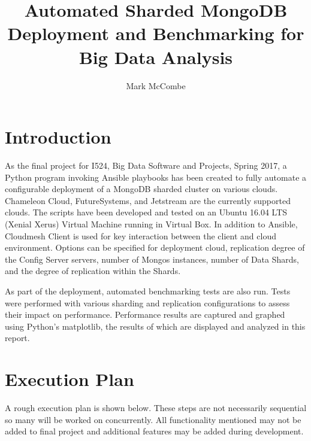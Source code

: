 \documentclass[9pt,twocolumn,twoside]{../../styles/osajnl}
\title{Automated Sharded MongoDB Deployment and Benchmarking for Big Data Analysis}
\author[1,*]{Mark McCombe}
\affil[1]{School of Informatics and Computing, Bloomington, IN 47408, U.S.A.}
\affil[*]{Corresponding authors: laszewski@gmail.com}
\begin{document}
\maketitle

\section{Introduction}

As the final project for I524, Big Data Software and Projects, Spring 2017, a Python program invoking Ansible playbooks has been created to fully automate a configurable deployment of a MongoDB sharded cluster on various clouds.  Chameleon Cloud, FutureSystems, and Jetstream are the currently supported clouds.  The scripts have been developed and tested on an Ubuntu 16.04 LTS (Xenial Xerus) Virtual Machine running in Virtual Box.  In addition to Ansible, Cloudmesh Client is used for key interaction between the client and cloud environment.  Options can be specified  for deployment cloud, replication degree of the Config Server servers, number of Mongos instances, number of Data Shards, and the degree of replication within the Shards.

As part of the deployment, automated benchmarking tests are also run.  Tests were performed with various sharding and replication configurations to assess their impact on performance.  Performance results are captured and graphed using Python's matplotlib, the results of which are displayed and analyzed in this report.

\section{Execution Plan}

A rough execution plan is shown below.  These steps are not necessarily sequential so many will be worked on concurrently.  All functionality mentioned may not be added to final project and additional features may be added during development.
\end{document}
